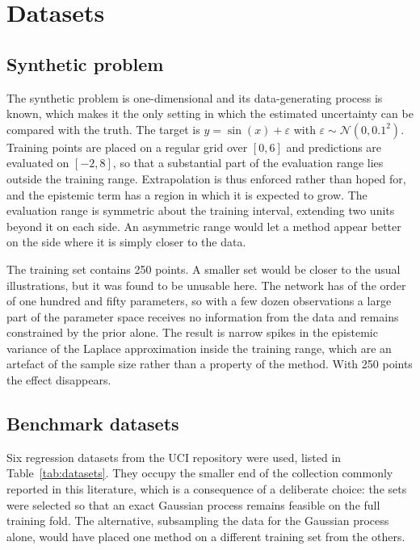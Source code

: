 \section{Datasets}
\label{sec:datasets}

\subsection{Synthetic problem}
\label{subsec:synthetic-data}

The synthetic problem is one-dimensional and its data-generating process is known,
which makes it the only setting in which the estimated uncertainty can be compared
with the truth. The target is $y = \sin(x) + \varepsilon$ with
$\varepsilon \sim \mathcal{N}(0, 0.1^2)$. Training points are placed on a regular grid
over $[0, 6]$ and predictions are evaluated on $[-2, 8]$, so that a substantial part of
the evaluation range lies outside the training range. Extrapolation is thus enforced
rather than hoped for, and the epistemic term has a region in which it is expected to
grow. The evaluation range is symmetric about the training interval, extending two
units beyond it on each side. An asymmetric range would let a method appear better on
the side where it is simply closer to the data.

The training set contains 250 points. A smaller set would be closer to the usual
illustrations, but it was found to be unusable here. The network has of the order of
one hundred and fifty parameters, so with a few dozen observations a large part of
the parameter space receives no information from the data and remains constrained by
the prior alone. The result is narrow spikes in the epistemic variance of the Laplace
approximation inside the training range, which are an artefact of the sample size
rather than a property of the method. With 250 points the effect disappears.

\subsection{Benchmark datasets}
\label{subsec:benchmark-data}

Six regression datasets from the UCI repository were used, listed in
Table~\ref{tab:datasets}. They occupy the smaller end of the collection commonly
reported in this literature, which is a consequence of a deliberate choice: the sets
were selected so that an exact Gaussian process remains feasible on the full training
fold. The alternative, subsampling the data for the Gaussian process alone, would have
placed one method on a different training set from the others.

